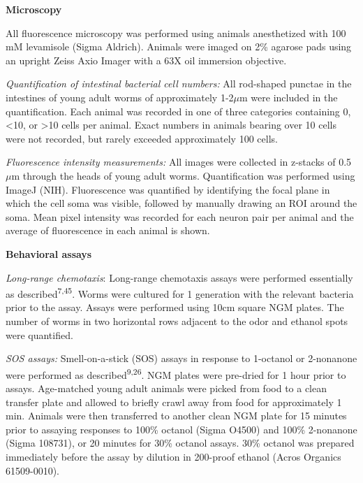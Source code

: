 \documentclass[11pt,]{article}
\begin{document}
\vspace{2\parsep}

\noindent   \textbf{Microscopy}

All fluorescence microscopy was performed using animals anesthetized
with 100 mM levamisole (Sigma Aldrich). Animals were imaged on 2\%
agarose pads using an upright Zeiss Axio Imager with a 63X oil immersion
objective.

\emph{Quantification of intestinal bacterial cell numbers:} All
rod-shaped punctae in the intestines of young adult worms of
approximately 1-2\(\mu\)m were included in the quantification. Each
animal was recorded in one of three categories containing 0,
\textless{}10, or \textgreater{}10 cells per animal. Exact numbers in
animals bearing over 10 cells were not recorded, but rarely exceeded
approximately 100 cells.

\emph{Fluorescence intensity measurements:} All images were collected in
z-stacks of 0.5 \(\mu\)m through the heads of young adult worms.
Quantification was performed using ImageJ (NIH). Fluorescence was
quantified by identifying the focal plane in which the cell soma was
visible, followed by manually drawing an ROI around the soma. Mean pixel
intensity was recorded for each neuron pair per animal and the average
of fluorescence in each animal is shown.

\vspace{2\parsep}

\noindent \textbf{Behavioral assays}

\emph{Long-range chemotaxis}: Long-range chemotaxis assays were
performed essentially as described\textsuperscript{7,45}. Worms were
cultured for 1 generation with the relevant bacteria prior to the assay.
Assays were performed using 10cm square NGM plates. The number of worms
in two horizontal rows adjacent to the odor and ethanol spots were
quantified.

\emph{SOS assays:} Smell-on-a-stick (SOS) assays in response to
1-octanol or 2-nonanone were performed as
described\textsuperscript{9,26}. NGM plates were pre-dried for 1 hour
prior to assays. Age-matched young adult animals were picked from food
to a clean transfer plate and allowed to briefly crawl away from food
for approximately 1 min. Animals were then transferred to another clean
NGM plate for 15 minutes prior to assaying responses to 100\% octanol
(Sigma O4500) and 100\% 2-nonanone (Sigma 108731), or 20 minutes for
30\% octanol assays. 30\% octanol was prepared immediately before the
assay by dilution in 200-proof ethanol (Acros Organics 61509-0010).
\end{document}
